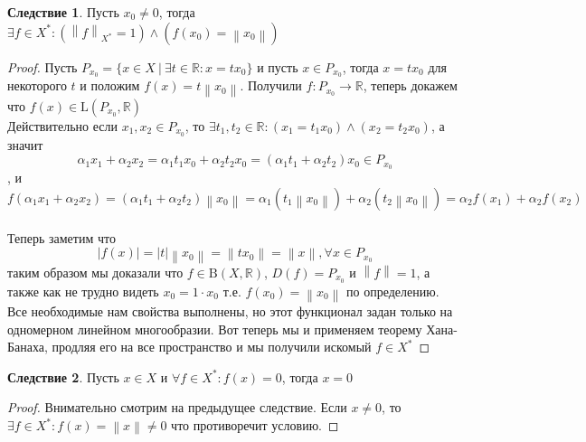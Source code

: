 \documentclass[12pt,a4paper]{article}
\theoremstyle{definition}
\newtheorem{corollary}{Следствие}[theorem]
\newcommand{\Real}{\mathbb{R}}
\newcommand{\norm}[1]{\left\lVert#1\right\rVert}
\newcommand{\setbuild}[2]{\{#1\:|\:#2\}}
\newcommand{\bounded}[2]{\textrm{B}(#1, #2)}
\newcommand{\linear}[2]{\textrm{L}(#1, #2)}
\begin{document}
\begin{corollary}\label{corll:1}
	Пусть $x_0 \neq 0$, тогда \\ $\exists f\in X^*: (\norm{f}_{X^*} = 1) \wedge (f(x_0) = \norm{x_0})$
\end{corollary}
\begin{proof}
	Пусть $P_{x_0} = \setbuild{x\in X}{\exists t\in\Real: x = tx_0}$ и пусть $x\in P_{x_0}$, тогда $x=tx_0$ для некоторого $t$ и положим $f(x)=t\norm{x_0}$. Получили $f:P_{x_0} \to \Real$, теперь докажем что $f(x)\in \linear{P_{x_0}}{\Real}$ \\
	
	Действительно если $x_1,x_2 \in P_{x_0}$, то $\exists t_1,t_2\in\Real: (x_1 = t_1 x_0) \wedge (x_2 = t_2 x_0)$, а значит $$\alpha_1 x_1 + \alpha_2 x_2 = \alpha_1 t_1 x_0 + \alpha_2 t_2 x_0 = (\alpha_1 t_1 + \alpha_2 t_2)  x_0 \in P_{x_0}$$, и $$f(\alpha_1 x_1 + \alpha_2 x_2) = (\alpha_1 t_1 + \alpha_2 t_2)\norm{x_0} = \alpha_1 (t_1 \norm{x_0}) + \alpha_2 (t_2 \norm{x_0}) = \alpha_2 f(x_1) + \alpha_2 f(x_2)$$ \\
	
	Теперь заметим что $$|f(x)| = |t|\norm{x_0} = \norm{tx_0} = \norm{x}, \forall x \in P_{x_0}$$ таким образом мы доказали что $f\in\bounded{X}{\Real}$, $D(f) = P_{x_0}$ и $\norm{f} = 1$, а также как не трудно видеть $x_0 = 1\cdot x_0$ т.е. $f(x_0) = \norm{x_0}$ по определению. Все необходимые нам свойства выполнены, но этот функционал задан только на одномерном линейном многообразии. Вот теперь мы и применяем теорему Хана-Банаха, продляя его на все пространство и мы получили искомый $f\in X^*$
\end{proof}

\begin{corollary}\label{corll:2}
	Пусть $x\in X$ и $\forall f \in X^* : f(x)=0$, тогда $x = 0$
\end{corollary}
\begin{proof}
	Внимательно смотрим на предыдущее следствие. Если $x \neq 0$, то $\exists f \in X^*: f(x) = \norm{x} \neq 0$ что противоречит условию.
\end{proof}
\end{document}
